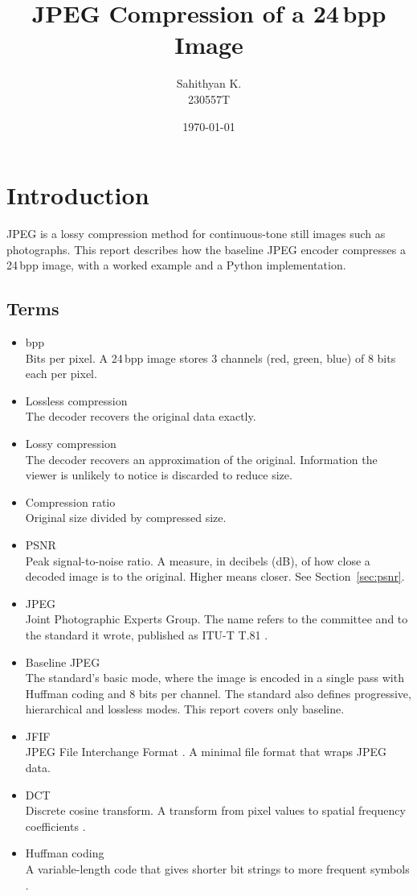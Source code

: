 \documentclass[11pt,a4paper]{article}
\title{JPEG Compression of a 24\,bpp Image}
\author{Sahithyan K. \\ 230557T}
\date{\today}
\begin{document}
\maketitle

\section{Introduction}

JPEG is a lossy compression method for continuous-tone still images such as photographs. This report describes how the baseline JPEG encoder compresses a 24\,bpp image, with a worked example and a Python implementation.

\subsection{Terms}

\begin{itemize}
\item bpp\\
  Bits per pixel. A 24\,bpp image stores 3 channels (red, green, blue) of 8 bits each per pixel.
\item Lossless compression\\
  The decoder recovers the original data exactly.
\item Lossy compression\\
  The decoder recovers an approximation of the original. Information the viewer is unlikely to notice is discarded to reduce size.
\item Compression ratio\\
  Original size divided by compressed size.
\item PSNR\\
  Peak signal-to-noise ratio. A measure, in decibels (dB), of how close a decoded image is to the original. Higher means closer. See Section~\ref{sec:psnr}.
\item JPEG\\
  Joint Photographic Experts Group. The name refers to the committee and to the standard it wrote, published as ITU-T T.81 \cite{t81}.
\item Baseline JPEG\\
  The standard's basic mode, where the image is encoded in a single pass with Huffman coding and 8 bits per channel. The standard also defines progressive, hierarchical and lossless modes. This report covers only baseline.
\item JFIF\\
  JPEG File Interchange Format \cite{jfif}. A minimal file format that wraps JPEG data.
\item DCT\\
  Discrete cosine transform. A transform from pixel values to spatial frequency coefficients \cite{ahmed1974}.
\item Huffman coding\\
  A variable-length code that gives shorter bit strings to more frequent symbols \cite{huffman1952}.
\end{itemize}
\end{document}
